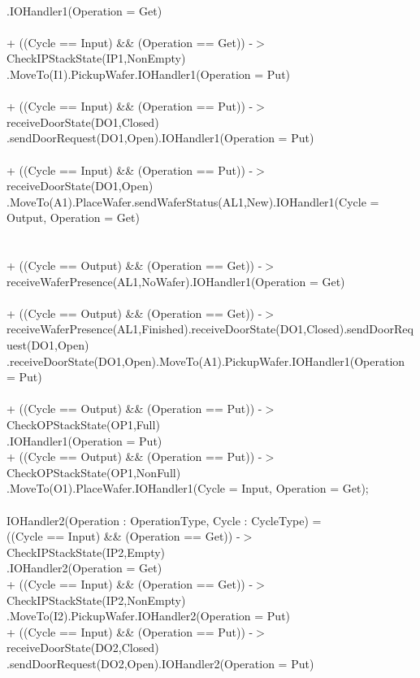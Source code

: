 \documentclass[a4paper,12pt]{article}
\begin{document}
\\.IOHandler1(Operation = Get)
\\
\\+ ((Cycle == Input) \&\& (Operation == Get)) -$>$ CheckIPStackState(IP1,NonEmpty)
\\.MoveTo(I1).PickupWafer.IOHandler1(Operation = Put)
\\
\\+ ((Cycle == Input) \&\& (Operation == Put)) -$>$ receiveDoorState(DO1,Closed)
\\.sendDoorRequest(DO1,Open).IOHandler1(Operation = Put)
\\
\\+ ((Cycle == Input) \&\& (Operation == Put)) -$>$ receiveDoorState(DO1,Open)
\\.MoveTo(A1).PlaceWafer.sendWaferStatus(AL1,New).IOHandler1(Cycle = Output, Operation = Get)
\\
\\
\\+ ((Cycle == Output) \&\& (Operation == Get)) -$>$ receiveWaferPresence(AL1,NoWafer).IOHandler1(Operation = Get)
\\
\\+ ((Cycle == Output) \&\& (Operation == Get)) -$>$ receiveWaferPresence(AL1,Finished).receiveDoorState(DO1,Closed).sendDoorRequest(DO1,Open)
.receiveDoorState(DO1,Open).MoveTo(A1).PickupWafer.IOHandler1(Operation = Put)
\\
\\+ ((Cycle == Output) \&\& (Operation == Put)) -$>$ CheckOPStackState(OP1,Full)
\\.IOHandler1(Operation = Put)
\\+ ((Cycle == Output) \&\& (Operation == Put)) -$>$ CheckOPStackState(OP1,NonFull)
\\.MoveTo(O1).PlaceWafer.IOHandler1(Cycle = Input, Operation = Get);
\\
\\IOHandler2(Operation : OperationType, Cycle : CycleType) =
\\((Cycle == Input) \&\& (Operation == Get)) -$>$ CheckIPStackState(IP2,Empty)
\\.IOHandler2(Operation = Get)
\\+ ((Cycle == Input) \&\& (Operation == Get)) -$>$ CheckIPStackState(IP2,NonEmpty)
\\.MoveTo(I2).PickupWafer.IOHandler2(Operation = Put)
\\+ ((Cycle == Input) \&\& (Operation == Put)) -$>$ receiveDoorState(DO2,Closed)
\\.sendDoorRequest(DO2,Open).IOHandler2(Operation = Put)
\end{document}
